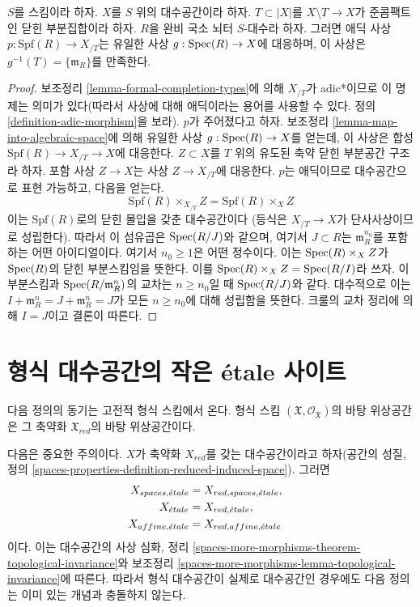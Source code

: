 \begin{lemma}
\label{lemma-adic-into-completion}
$S$를 스킴이라 하자. $X$를 $S$ 위의 대수공간이라 하자.
$T \subset |X|$를 $X \setminus T \to X$가 준콤팩트인 닫힌 부분집합이라
하자. $R$을 완비 국소 뇌터 $S$-대수라 하자. 그러면 애딕 사상
$p : \text{Spf}(R) \to X_{/T}$는 유일한 사상
$g : \mathop{\mathrm{Spec}}(R) \to X$에 대응하며, 이 사상은
$g^{-1}(T) = \{\mathfrak m_R\}$를 만족한다.
\end{lemma}

\begin{proof}
보조정리 \ref{lemma-formal-completion-types}에 의해 $X_{/T}$가
adic*이므로 이 명제는 의미가 있다(따라서 사상에 대해 애딕이라는 용어를
사용할 수 있다. 정의 \ref{definition-adic-morphism}을 보라).
$p$가 주어졌다고 하자. 보조정리
\ref{lemma-map-into-algebraic-space}에 의해 유일한 사상
$g : \mathop{\mathrm{Spec}}(R) \to X$를 얻는데, 이 사상은 합성
$\text{Spf}(R) \to X_{/T} \to X$에 대응한다. $Z \subset X$를 $T$ 위의 유도된 축약
닫힌 부분공간 구조라 하자. 포함 사상 $Z \to X$는 사상
$Z \to X_{/T}$에 대응한다. %
$p$는 애딕이므로 대수공간으로 표현 가능하고, 다음을 얻는다.
$$
\text{Spf}(R) \times_{X_{/T}} Z = \text{Spf}(R) \times_X Z
$$
이는 $\text{Spf}(R)$로의 닫힌 몰입을 갖춘 대수공간이다
(등식은 $X_{/T} \to X$가 단사사상이므로 성립한다).
따라서 이 섬유곱은 $\mathop{\mathrm{Spec}}(R/J)$와 같으며, 여기서 $J \subset R$는
$\mathfrak m_R^{n_0}$를 포함하는 어떤 아이디얼이다. 여기서
$n_0 \geq 1$은 어떤 정수이다. 이는 $\mathop{\mathrm{Spec}}(R) \times_X Z$가
$\mathop{\mathrm{Spec}}(R)$의 닫힌 부분스킴임을 뜻한다. 이를
$\mathop{\mathrm{Spec}}(R) \times_X Z = \mathop{\mathrm{Spec}}(R/I)$라 쓰자. 이 부분스킴과
$\mathop{\mathrm{Spec}}(R/\mathfrak m_R^n)$의 교차는 $n \geq n_0$일 때
$\mathop{\mathrm{Spec}}(R/J)$와 같다. 대수적으로 이는
$I + \mathfrak m_R^n = J + \mathfrak m_R^n = J$가 모든
$n \geq n_0$에 대해 성립함을 뜻한다.
크룰의 교차 정리에 의해 $I = J$이고 결론이 따른다.
\end{proof}

\section{형식 대수공간의 작은 \'etale 사이트}
\label{section-etale-sites}

\noindent
다음 정의의 동기는 고전적 형식 스킴에서 온다. 형식 스킴
$(\mathfrak X, \mathcal{O}_\mathfrak X)$의 바탕 위상공간은
그 축약화 $\mathfrak X_{red}$의 바탕 위상공간이다.

\medskip\noindent
다음은 중요한 주의이다. $X$가 축약화 $X_{red}$를 갖는 대수공간이라고
하자(공간의 성질, 정의
\ref{spaces-properties-definition-reduced-induced-space}).
그러면
$$
\begin{aligned}
X_{spaces, {\acute{e}tale}} &= X_{red, spaces, {\acute{e}tale}},\quad \\
X_{\acute{e}tale} &= X_{red, {\acute{e}tale}},\quad \\
X_{affine, {\acute{e}tale}} &= X_{red, affine, {\acute{e}tale}}
\end{aligned}
$$
이다. 이는 대수공간의 사상 심화, 정리
\ref{spaces-more-morphisms-theorem-topological-invariance}와
보조정리 \ref{spaces-more-morphisms-lemma-topological-invariance}에
따른다. 따라서 형식 대수공간이 실제로 대수공간인 경우에도 다음 정의는
이미 있는 개념과 충돌하지 않는다.

